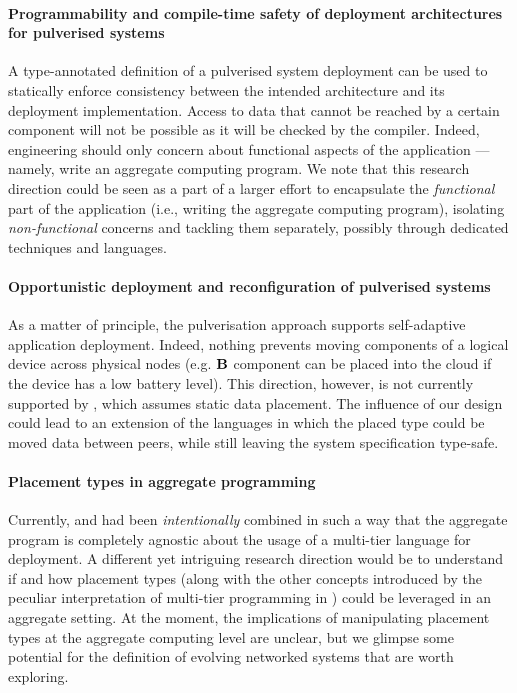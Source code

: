 \paragraph*{Programmability and compile-time safety of deployment architectures for pulverised systems}
%
A type-annotated definition of a pulverised system deployment can be used to statically enforce consistency between the intended architecture and its deployment implementation.
%
Access to data that cannot be reached by a certain component will not be possible as it will be checked by the compiler.
 Indeed, engineering should only concern about functional aspects of the application --- namely, write an aggregate computing program. 
 We note that this research direction could be seen as a part of a larger effort to encapsulate the \emph{functional} part of the application (i.e., writing the aggregate computing program),
 isolating \emph{non-functional} concerns and tackling them separately, possibly through dedicated techniques and languages.

\paragraph*{Opportunistic deployment and reconfiguration of pulverised systems}
As a matter of principle, the pulverisation approach supports self-adaptive application deployment. 
  Indeed, nothing prevents moving components of a logical device across physical nodes (e.g. $\mathbf{B}$ component can be placed into the cloud if the device has a low battery level). 
  This direction, however, is not currently supported by \scalaloci{}, which assumes static data placement. 
  The influence of our design could lead to an extension of the languages in which the placed type could be moved data between peers, while still leaving the system specification type-safe.
 
\paragraph*{Placement types in aggregate programming} Currently, \scalaloci{} and \scafi{} had been \emph{intentionally} combined in such a way that the aggregate program is completely agnostic about the usage of a multi-tier language for deployment. 
A different yet intriguing research direction would be to understand if and how placement types 
  (along with the other concepts introduced by the peculiar interpretation of multi-tier programming in \scalaloci{})
  could be leveraged in an aggregate setting.
  At the moment, the implications of manipulating placement types at the aggregate computing level are unclear,
  but we glimpse some potential for the definition of evolving networked systems that are worth exploring.

